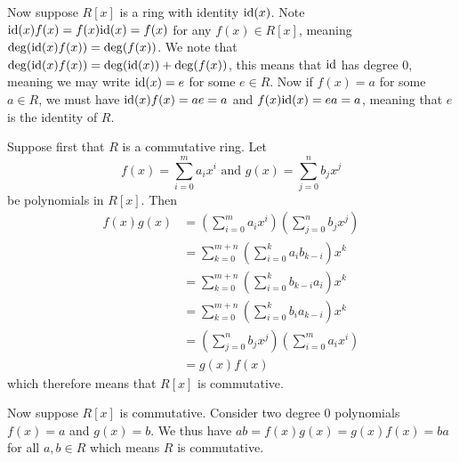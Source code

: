 \begin{questions}
\begin{partquestions}{\alph*}
        Now suppose $R[x]$ is a ring with identity $\mathrm{id}(x)$. Note $\mathrm{id}(x)f(x) = f(x)\mathrm{id}(x) = f(x)$ for any $f(x) \in R[x]$, meaning $\deg(\mathrm{id}(x)f(x)) = \deg(f(x))$. We note that $\deg(\mathrm{id}(x)f(x)) = \deg(\mathrm{id}(x)) + \deg(f(x))$, this means that $\mathrm{id}$ has degree 0, meaning we may write $\mathrm{id}(x) = e$ for some $e \in R$. Now if $f(x) = a$ for some $a \in R$, we must have $\mathrm{id}(x)f(x) = ae = a$ and $f(x)\mathrm{id}(x) = ea = a$, meaning that $e$ is the identity of $R$.
        
        \item Suppose first that $R$ is a commutative ring. Let
        \[
            f(x) = \sum_{i=0}^ma_ix^i \text{ and } g(x) = \sum_{j=0}^nb_jx^j
        \]
        be polynomials in $R[x]$. Then
        \begin{align*}
            f(x)g(x) &= \left(\sum_{i=0}^ma_ix^i\right)\left(\sum_{j=0}^nb_jx^j\right)\\
            &= \sum_{k=0}^{m+n}\left(\sum_{i=0}^k a_{i}b_{k-i}\right)x^k\\
            &= \sum_{k=0}^{m+n}\left(\sum_{i=0}^k b_{k-i}a_{i}\right)x^k\\
            &= \sum_{k=0}^{m+n}\left(\sum_{i=0}^k b_{i}a_{k-i}\right)x^k\\
            &= \left(\sum_{j=0}^nb_jx^j\right)\left(\sum_{i=0}^ma_ix^i\right)\\
            &= g(x)f(x)
        \end{align*}
        which therefore means that $R[x]$ is commutative.

        Now suppose $R[x]$ is commutative. Consider two degree 0 polynomials $f(x) = a$ and $g(x) = b$. We thus have $ab = f(x)g(x) = g(x)f(x) = ba$ for all $a,b \in R$ which means $R$ is commutative.
    \end{partquestions}
\end{questions}

